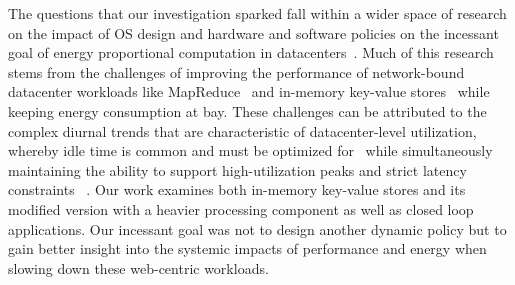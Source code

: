 \label{sec:related}







The questions that our investigation sparked fall within a wider space of research on the impact of OS design and hardware and software policies on the incessant goal of energy proportional computation in datacenters~\cite{energyproportion, warehouse-power, 268014}. Much of this research stems from the challenges of improving the performance of network-bound datacenter workloads like MapReduce~\cite{large-scale-mapreduce} and in-memory key-value stores~\cite{mica, zygos} while keeping energy consumption at bay. These challenges can be attributed to
the complex diurnal trends that are characteristic of datacenter-level utilization, whereby idle time is common and must be optimized for~\cite{hotpower2008, powernap, napsac} while simultaneously maintaining the ability to support high-utilization peaks and strict latency constraints ~\cite{Dynamo, SmoothOperator, oldi-pegasus, adrenaline, rubik, eurosys14, zygos, peafowl, 7425206, 10.1145/2830772.2830779, dreamweaver, dynsleep, udpm}. Our work examines both in-memory key-value stores and its modified version with a heavier processing component as well as closed loop applications. Our incessant goal was not to design another dynamic policy but to gain better insight into the systemic impacts of performance and energy when slowing down these web-centric workloads.

